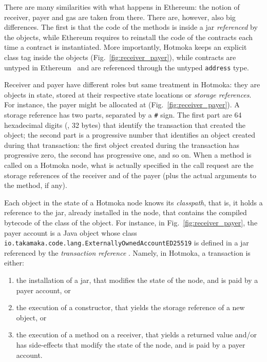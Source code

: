 \begin{commentbox}
There are many similarities with what happens in Ethereum: the notion of
receiver, payer and gas are taken from there. There are, however, also
big differences. The first is that the code of the methods is inside
a jar \emph{referenced} by the objects, while Ethereum requires to reinstall
the code of the contracts each time a contract is instantiated.
More importantly, Hotmoka keeps an explicit class tag inside the objects
(Fig.~\ref{fig:receiver_payer}),
while contracts are untyped in Ethereum~\cite{CrafaPZ19}
and are referenced through the untyped \texttt{address} type.
\end{commentbox}

Receiver and payer have different roles but same treatment in Hotmoka:
they are objects in state, stored at their respective state locations or
\emph{storage references}. For instance, the payer
might be allocated at \texttt{\accountOneShort{}}
(Fig.~\ref{fig:receiver_payer}). A storage reference has two parts, separated
by a \texttt{\#} sign. The first part are 64 hexadecimal digits (\ie, 32 bytes)
that identify the
transaction that created the object; the second part is a progressive number
that identifies an object created during that transaction: the first object
created during the transaction has progressive zero, the second has progressive
one, and so on. When a method is called on a Hotmoka node, what is actually specified
in the call request are the storage references of the receiver and of the payer
(plus the actual arguments to the method, if any).

Each object in the state of a Hotmoka node knows its \emph{classpath},
that is, it holds a reference to the jar, already installed in the node,
that contains the compiled bytecode of the class of the object. For instance,
in Fig.~\ref{fig:receiver_payer}, the payer account is a Java object whose
class \texttt{io.takamaka.code.lang.ExternallyOwnedAccountED25519}
is defined in a jar referenced by the \emph{transaction reference}
\texttt{\takamakaCodeShort{}}.
Namely, in Hotmoka, a transaction is either:
%
\begin{enumerate}
\item the installation of a jar, that modifies the state of the node, and is paid by a payer account, or
\item the execution of a constructor, that yields the storage reference of a new object, or
\item the execution of a method on a receiver, that yields a returned
  value and/or has side-effects that modify the state of the node, and is paid by a payer account.
\end{enumerate}

